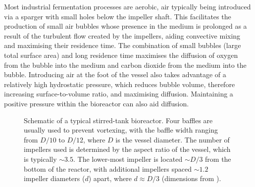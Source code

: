 Most industrial fermentation processes are aerobic, air typically being introduced via a sparger with small holes below the impeller shaft. This facilitates the production of small air bubbles whose presence in the medium is prolonged as a result of the turbulent flow created by the impellers, aiding convective mixing and maximising their residence time. The combination of small bubbles (large total surface area) and long residence time maximises the diffusion of oxygen from the bubble into the medium and carbon dioxide from the medium into the bubble. Introducing air at the foot of the vessel also takes advantage of a relatively high hydrostatic pressure, which reduces bubble volume, therefore increasing surface-to-volume ratio, and maximising diffusion. Maintaining a positive pressure within the bioreactor can also aid diffusion.

\begin{figure}[htbp]
	\centering
	\caption{Schematic of a typical stirred-tank bioreactor. Four baffles are usually used to prevent vortexing, with the baffle width ranging from $D/10$ to $D/12$, where $D$ is the vessel diameter. The number of impellers used is determined by the aspect ratio of the vessel, which is typically $\sim 3.5$. The lower-most impeller is located $\sim D /3$ from the bottom of the reactor, with additional impellers spaced $\sim 1.2$ impeller diameters ($d$) apart, where $d \approx D/3$ (dimensions from \cite{chisti2001}).}
	\label{fig:BioReactor}
\end{figure}

